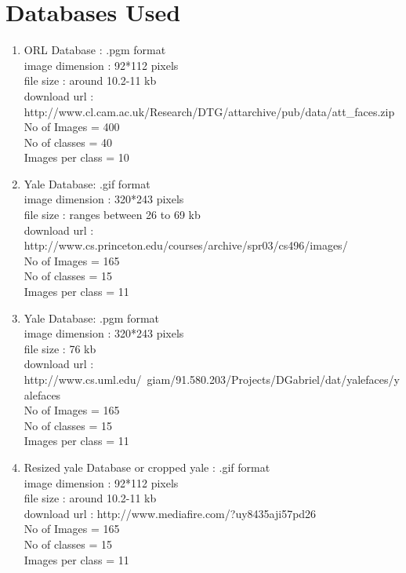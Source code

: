 \documentclass[10pt,a4paper]{article}
\begin{document}
\section{Databases Used} 
\begin{enumerate}

\item ORL Database : .pgm format \\
   image dimension : 92*112 pixels \\
   file size : around 10.2-11 kb \\
   download url : http://www.cl.cam.ac.uk/Research/DTG/attarchive/pub/data/att\_faces.zip	\\
   No of Images = 400 \\
   No of classes = 40 \\
   Images per class = 10 \\

\item Yale Database: .gif format \\
   image dimension : 320*243 pixels \\
   file size : ranges between 26 to 69 kb \\	 	
   download url : http://www.cs.princeton.edu/courses/archive/spr03/cs496/images/ \\
   No of Images = 165 \\
   No of classes = 15 \\
   Images per class = 11 \\	

\item Yale Database: .pgm format \\
   image dimension : 320*243 pixels \\
   file size : 76 kb \\
   download url : http://www.cs.uml.edu/~giam/91.580.203/Projects/DGabriel/dat/yalefaces/yalefaces \\
   No of Images = 165 \\
   No of classes = 15 \\
   Images per class = 11 \\

\item Resized yale Database or cropped yale : .gif format   \\
   image dimension : 92*112 pixels \\
   file size : around 10.2-11 kb \\
   download url : http://www.mediafire.com/?uy8435aji57pd26 \\
   No of Images = 165 \\
   No of classes = 15 \\
   Images per class = 11 \\


\end{enumerate}
\end{document}
